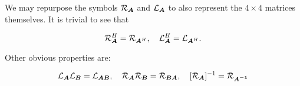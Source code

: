 \documentclass[useAMS,usenatbib]{mn2e}
\makeatletter
\newcommand{\COMPLEX}{\mathbb{C}}
\newcommand{\mat}[1]{{\bmath{#1}}}
\newcommand{\Matrix}[2]{\left [ \begin{array}{@{}#1@{}}#2\end{array} \right ]}
\newcommand{\Rop}[1]{\mathcal{R}_{{#1}}}
\newcommand{\Lop}[1]{\mathcal{L}_{{#1}}}
\makeatother
\begin{document}





We may repurpose the symbols $\Rop{\mat{A}}$ and $\Lop{\mat{A}}$ to also represent the $4\times4$ matrices 
themselves. It is trivial to see that

\begin{equation}
\label{eq:RH:LH}
\Rop{\mat{A}}^H = \Rop{\mat{A}^H},~~~\Lop{\mat{A}}^H = \Lop{\mat{A}^H}.
\end{equation}



Other obvious properties are:

\begin{equation}
\label{eq:RAB:LAB}
\Lop{\mat{A}}\Lop{\mat{B}} = \Lop{\mat{AB}},~~~\Rop{\mat{A}}\Rop{\mat{B}} = \Rop{\mat{BA}},~~~[\Rop{\mat{A}}]^{-1} = \Rop{\mat{A^{-1}}}
\end{equation}
\end{document}
